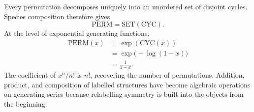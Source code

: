 Every permutation decomposes uniquely into an unordered set of disjoint cycles.  Species composition therefore gives
\[
  \mathrm{PERM}=\mathrm{SET}(\mathrm{CYC}).
\]
At the level of exponential generating functions,
\[
\begin{aligned}
  \mathrm{PERM}(x)
  &=\exp(\mathrm{CYC}(x))\\
  &=\exp\bigl(-\log(1-x)\bigr)\\
  &=\frac1{1-x}.
\end{aligned}
\]
The coefficient of \(x^n/n!\) is \(n!\), recovering the number of permutations.  Addition, product, and composition of labelled structures have become algebraic operations on generating series because relabelling symmetry is built into the objects from the beginning.